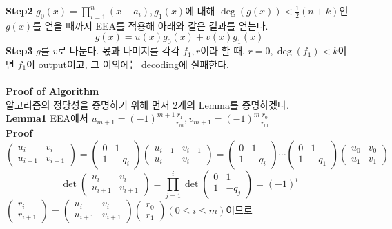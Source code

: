 \documentclass[11pt]{article}
\begin{document}
\textbf{Step2} $g_{0}(x) = \prod_{i=1}^{n} (x-a_{i}),g_{1}(x)$에 대해 $\deg (g(x))<\frac{1}{2}(n+k)$인 $g(x)$를 얻을 때까지 EEA를 적용해 아래와 같은 결과를 얻는다.
\begin{displaymath}
g(x) = u(x)g_{0}(x)+v(x)g_{1}(x)
\end{displaymath}
\textbf{Step3} $g$를 $v$로 나눈다. 몫과 나머지를 각각 $f_{1},r$이라 할 때, $r=0,\deg(f_{1})<k$이면 $f_{1}$이 output이고, 그 이외에는 decoding에 실패한다. \\\\
{\large \textbf{Proof of Algorithm}}\\
알고리즘의 정당성을 증명하기 위해 먼저 2개의 Lemma를 증명하겠다.\\
\textbf{Lemma1} EEA에서 $u_{m+1}=(-1)^{m+1}\frac{r_{1}}{r_{m}},v_{m+1}=(-1)^{m}\frac{r_{0}}{r_{m}}$\\
\textbf{Proof} 
\begin{displaymath}
\begin{pmatrix}u_{i}&v_{i}\\ u_{i+1}&v_{i+1}\end{pmatrix}=
\begin{pmatrix}0&1\\ 1&-q_{i}\end{pmatrix}\begin{pmatrix}u_{i-1}&v_{i-1}\\ u_{i}&v_{i}\end{pmatrix}
=\begin{pmatrix}0&1\\ 1&-q_{i}\end{pmatrix}\cdots\begin{pmatrix}0&1\\ 1&-q_{1}\end{pmatrix}\begin{pmatrix}u_{0}&v_{0}\\ u_{1}&v_{1}\end{pmatrix}
\end{displaymath}
\begin{displaymath}
\det\begin{pmatrix}u_{i}&v_{i}\\ u_{i+1}&v_{i+1}\end{pmatrix}=\prod_{j=1}^{i}\det \begin{pmatrix}0&1\\ 1&-q_{j}\end{pmatrix}=(-1)^{i}
\end{displaymath}
$\begin{pmatrix}r_{i}\\ r_{i+1}\end{pmatrix}=\begin{pmatrix}u_{i}&v_{i}\\ u_{i+1}&v_{i+1}\end{pmatrix}\begin{pmatrix}r_{0}\\ r_{1}\end{pmatrix}(0\leq i\leq m)$이므로 
\end{document}
